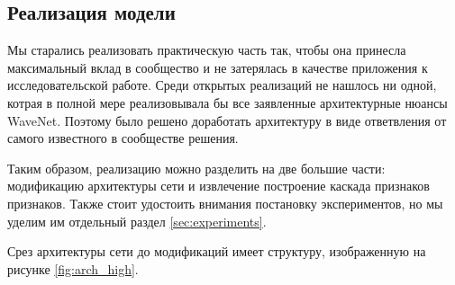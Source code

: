 \documentclass[../diploma.tex]{subfiles}
\begin{document}
\subsection{Реализация модели}

Мы старались реализовать практическую часть так, чтобы она принесла максимальный вклад в сообщество и не затерялась в качестве приложения к исследовательской работе. Среди открытых реализаций не нашлось ни одной, котрая в полной мере реализовывала бы все заявленные архитектурные нюансы WaveNet. 
Поэтому было решено доработать архитектуру в виде ответвления от самого известного в сообществе решения.

Таким образом, реализацию можно разделить на две большие части: модификацию архитектуры сети и извлечение построение каскада признаков признаков. 
Также стоит удостоить внимания постановку экспериментов, но мы уделим им отдельный раздел \ref{sec:experiments}.

Срез архитектуры сети до модификаций имеет структуру, изображенную на рисунке \ref{fig:arch_high}.
\end{document}
